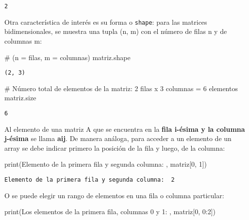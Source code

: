 \documentclass[
  letterpaper,
  DIV=11,
  numbers=noendperiod]{scrreprt}
\newenvironment{Shaded}{\begin{snugshade}}{\end{snugshade}}
\newcommand{\BuiltInTok}[1]{\textcolor[rgb]{0.00,0.23,0.31}{#1}}
\newcommand{\CommentTok}[1]{\textcolor[rgb]{0.37,0.37,0.37}{#1}}
\newcommand{\DecValTok}[1]{\textcolor[rgb]{0.68,0.00,0.00}{#1}}
\newcommand{\NormalTok}[1]{\textcolor[rgb]{0.00,0.23,0.31}{#1}}
\newcommand{\StringTok}[1]{\textcolor[rgb]{0.13,0.47,0.30}{#1}}
\begin{document}
\begin{verbatim}
2
\end{verbatim}

Otra característica de interés es su forma o \texttt{shape}: para las
matrices bidimensionales, se muestra una tupla (n, m) con el número de
filas n y de columnas m:

\begin{Shaded}
\begin{Highlighting}[]
\CommentTok{\# (n = filas, m = columnas)}
\NormalTok{matriz.shape}
\end{Highlighting}
\end{Shaded}

\begin{verbatim}
(2, 3)
\end{verbatim}

\begin{Shaded}
\begin{Highlighting}[]
\CommentTok{\# Número total de elementos de la matriz: 2 filas x 3 columnas = 6 elementos}
\NormalTok{matriz.size}
\end{Highlighting}
\end{Shaded}

\begin{verbatim}
6
\end{verbatim}

Al elemento de una matriz A que se encuentra en la \textbf{fila i-ésima
y la columna j-ésima} se llama \textbf{aij}. De manera análoga, para
acceder a un elemento de un array se debe indicar primero la posición de
la fila y luego, de la columna:

\begin{Shaded}
\begin{Highlighting}[]
\BuiltInTok{print}\NormalTok{(}\StringTok{\textquotesingle{}Elemento de la primera fila y segunda columna: \textquotesingle{}}\NormalTok{, matriz[}\DecValTok{0}\NormalTok{, }\DecValTok{1}\NormalTok{])}
\end{Highlighting}
\end{Shaded}

\begin{verbatim}
Elemento de la primera fila y segunda columna:  2
\end{verbatim}

O se puede elegir un rango de elementos en una fila o columna
particular:

\begin{Shaded}
\begin{Highlighting}[]
\BuiltInTok{print}\NormalTok{(}\StringTok{\textquotesingle{}Los elementos de la primera fila, columnas 0 y 1: \textquotesingle{}}\NormalTok{, matriz[}\DecValTok{0}\NormalTok{, }\DecValTok{0}\NormalTok{:}\DecValTok{2}\NormalTok{])}
\end{Highlighting}
\end{Shaded}
\end{document}
